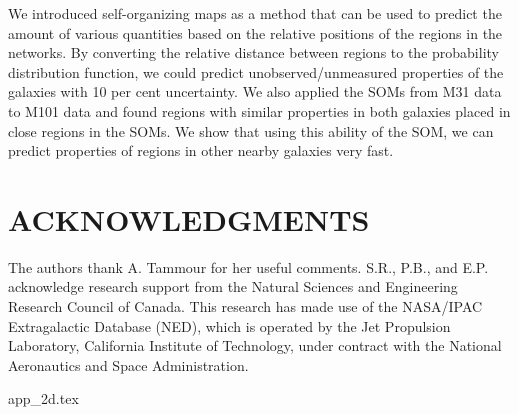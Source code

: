\documentclass[useAMS,usenatbib]{mn2e}
\begin{document}
We introduced self-organizing maps as a method that can be used to predict the amount of various quantities based on the relative positions of the regions in the networks.
By converting the relative distance between regions to the probability distribution function, we could predict unobserved/unmeasured properties of the galaxies with 10 per cent uncertainty.
We also applied the SOMs from M31 data to M101 data and found regions with similar properties in both galaxies placed in close regions in the SOMs.
We show that using this ability of the SOM, we can predict properties of regions in other nearby galaxies very fast.

 

\section*{ACKNOWLEDGMENTS}
The authors thank A. Tammour for her useful comments. 
S.R., P.B., and E.P. acknowledge research support from the Natural Sciences and Engineering Research Council of Canada. This research has made use of the NASA/IPAC Extragalactic Database (NED), which is operated by the Jet Propulsion Laboratory, California Institute of Technology, under contract with the National Aeronautics and Space Administration.


{app_2d.tex}
\end{document}
